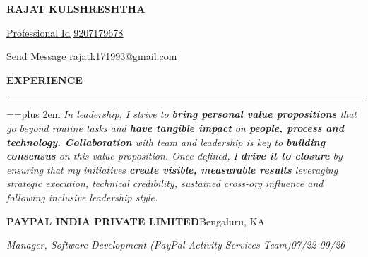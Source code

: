 \documentclass[10pt,letterpaper]{article}
\newcommand{\urlProfessionalId}{https://www.linkedin.com/in/rajat-kulshreshtha-a598434b/}
\newcommand{\urlSendMessage}{https://t.me/rkulshreshtha}
\newcommand{\urlPhoneNum}{https://wa.link/kzhbd8}
\newlength{\entrygap}      \setlength{\entrygap}{8pt}
\newlength{\blockindent}   \setlength{\blockindent}{11.5pt}
\renewcommand{\normalsize}{\fontsize{10}{11.5}\selectfont}
\newlength{\textrightinset}\setlength{\textrightinset}{5.25pt}   %
\newcommand{\bd}[1]{\textbf{#1}}
\newcommand{\ulink}[2]{\href{#1}{\textcolor{linkblue}{\underline{#2}}}}
\newcommand{\sectionbar}[3]{%
  \par\vspace{#1}%
  \centerline{\bfseries\fontsize{10.5}{12}\selectfont #3}%
  \par\nointerlineskip\vspace{3pt}%
  \noindent\rule{\linewidth}{#2}\par\vspace{1pt}}
\newcommand{\sect}[2][9pt]{\sectionbar{#1}{1.3pt}{#2}}
\newcommand{\entry}[4]{%
  \par\vspace{\entrygap}%
  \noindent\textbf{#1}\hfill #2\par
  \noindent\textcolor{rolecolor}{\textit{#3}}\hfill\textcolor{rolecolor}{\textit{#4}}\par
  \nopagebreak}
\begin{document}
\normalsize

\centerline{\bfseries\fontsize{12}{14}\selectfont RAJAT KULSHRESHTHA}
\vspace{1pt}
\noindent\ulink{\urlProfessionalId}{Professional Id}\hfill
         \ulink{\urlPhoneNum}{9207179678}\par
\noindent\ulink{\urlSendMessage}{Send Message}\hfill
         \ulink{mailto:rajatk171993@gmail.com}{rajatk171993@gmail.com}\par

\sect[3pt]{EXPERIENCE}

\vspace{0pt}
{\leftskip=\blockindent\rightskip=\dimexpr\textrightinset\relax plus 2em\relax\itshape
In leadership, I strive to \bd{bring personal value propositions} that go beyond routine
tasks and \bd{have tangible impact} on \bd{people, process and technology. Collaboration} with
team and leadership is key to \bd{building consensus} on this value proposition. Once
defined, I \bd{drive it to closure} by ensuring that my initiatives \bd{create visible,
measurable results} leveraging strategic execution, technical credibility, sustained
cross-org influence and following inclusive leadership style.\par}
\vspace{-3.5pt}
\entry{PAYPAL INDIA PRIVATE LIMITED}{Bengaluru, KA}
      {Manager, Software Development (PayPal Activity Services Team)}{07/22-09/26}
\end{document}

